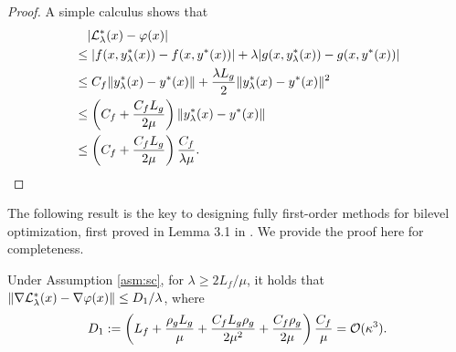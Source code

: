 \begin{proof}
A simple calculus shows that
    \begin{align*}
    &\quad \vert {\mathcal{L}}_{\lambda}^*(x) - \varphi(x) \vert \\
    &\le   \vert f(x,y_{\lambda}^*(x)) - f(x,y^*(x)) \vert + \lambda \vert g(x,y_{\lambda}^*(x)) - g(x,y^*(x)) \vert \\
    &\le C_f  \Vert y_{\lambda}^*(x) - y^*(x) \Vert + \frac{\lambda L_g}{2} \Vert y_{\lambda}^*(x) - y^*(x) \Vert^2 \\
    &\le \left(C_f + \frac{C_f L_g}{2 \mu} \right) \Vert y_{\lambda}^*(x) - y^*(x) \Vert \\
    &\le \left(C_f + \frac{C_f L_g}{2 \mu} \right) \frac{C_f }{\lambda \mu}.
    \end{align*}
\end{proof}
The following result is the key to designing fully first-order methods for bilevel optimization, first proved in Lemma 3.1 in \cite{kwon2023fully}. We provide the proof here for completeness.
\begin{lem} \label{lem:key-fully}
Under Assumption \ref{asm:sc}, for $\lambda \ge 2L_f/ \mu$,  it holds that $\Vert \nabla {\mathcal{L}}_{\lambda}^*(x) - \nabla \varphi(x) \Vert \le D_1 / \lambda$, where
\begin{align} \label{eq:D-lambda}
    D_1 :=  \left( L_f 
   + \frac{\rho_g L_g}{\mu} + \frac{C_f L_g \rho_g}{2\mu^2} + \frac{C_f \rho_g}{2\mu} 
    \right) \frac{C_f}{\mu} = {\mathcal{O}}(\kappa^3).
\end{align}
\end{lem}

